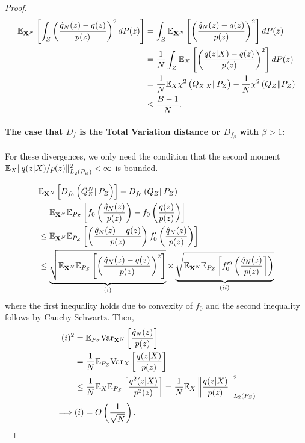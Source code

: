 \begin{proof}
\begin{align*}
 \mathbb{E}_{\mathbf{X}^N}\left[ \int_Z  \left(\frac{\hat{q}_N(z) - q(z)}{p(z)}\right)^2 dP(z) \right] &= \int_Z \mathbb{E}_{\mathbf{X}^N}\left[  \left(\frac{\hat{q}_N(z) - q(z)}{p(z)}\right)^2 \right] dP(z) \\
 &=\frac{1}{N} \int_Z \mathbb{E}_{X}\left[  \left(\frac{q(z|X) - q(z)}{p(z)}\right)^2 \right] dP(z) \\
 &= \frac{1}{N} \mathbb{E}_{X} \chi^2\left( Q_{Z|X} \| P_Z \right) - \frac{1}{N} \chi^2\left( Q_{Z} \| P_Z \right)\\
 &\leq \frac{B-1}{N}.
\end{align*}

\paragraph{The case that $D_f$ is the Total Variation distance or $D_{f_\beta}$ with $\beta>1$:}

For these divergences, we only need the condition that the second moment $\mathbb{E}_X \| q(z|X)/p(z)\|^2_{L_2(P_Z)} < \infty$ is bounded.

\begin{align*}
    & \mathbb{E}_{\mathbf{X}^N} \left[ D_{f_0}\left( \hat{Q}_Z^N \| P_Z\right)\right] - D_{f_0}\left( Q_{Z} \| P_Z\right)  \\
    &= \mathbb{E}_{\mathbf{X}^N}\mathbb{E}_{P_Z} \left[ f_0\left( \frac{\hat{q}_N(z)}{p(z)} \right) - f_0\left( \frac{q(z)}{p(z)} \right) \right] \\
    &\leq \mathbb{E}_{\mathbf{X}^N}\mathbb{E}_{P_Z} \left[ \left( \frac{\hat{q}_N(z) - q(z)}{p(z)} \right)     f_0'\left(\frac{\hat{q}_N(z)}{p(z)} \right) \right]  \\
    &\leq \underbrace{ \sqrt{ \mathbb{E}_{\mathbf{X}^N}\mathbb{E}_{P_Z} \left[\left( \frac{\hat{q}_N(z) - q(z)}{p(z)} \right)^2\right] }}_{(i)} 
    \times 
    \underbrace{\sqrt{\mathbb{E}_{\mathbf{X}^N}\mathbb{E}_{P_Z} \left[ f_0'^2\left(\frac{\hat{q}_N(z)}{p(z)}\right] \right) }}_{(ii)}
\end{align*}
where the first inequality holds due to convexity of $f_0$ and the second inequality follows by Cauchy-Schwartz.
Then,
\begin{align*}
    (i)^2 
    &= \mathbb{E}_{P_Z} \text{Var}_{\mathbf{X}^N}\left[\frac{\hat{q}_N(z)}{p(z)} \right]\\
    &= \frac{1}{N}\mathbb{E}_{P_Z} \text{Var}_{X}\left[\frac{q(z|X)}{p(z)} \right]\\
    &\leq \frac{1}{N}\mathbb{E}_{X} \mathbb{E}_{P_Z} \left[ \frac{q^2(z|X)}{p^2(z)} \right] = \frac{1}{N} \mathbb{E}_X \left\| \frac{q(z|X)}{p(z)} \right\|^2_{L_2(P_Z)}\\
    \implies & (i) = O\left(\frac{1}{\sqrt{N}}\right).
\end{align*}


\end{proof}
